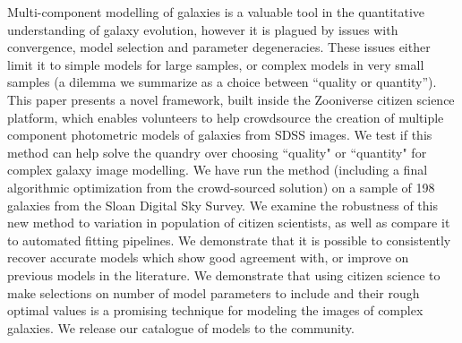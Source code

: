 \documentclass[../main.tex]{subfiles}
\begin{document}
Multi-component modelling of galaxies is a valuable tool in the quantitative understanding of galaxy evolution, however it is plagued by issues with convergence, model selection and parameter degeneracies. These issues either limit it to simple models for large samples, or complex models in very small samples  (a dilemma we summarize as a choice between “quality or quantity”). This paper presents a novel framework, built inside the Zooniverse citizen science platform, which enables volunteers to help crowdsource the creation of multiple component photometric models of galaxies from SDSS images. We test if this method can help solve the quandry over choosing ``quality" or ``quantity" for complex galaxy image modelling.
We have run the method (including a final algorithmic optimization from the crowd-sourced solution) on a sample of 198 galaxies from the Sloan Digital Sky Survey. We examine the robustness of this new method to variation in population of citizen scientists, as well as compare it to automated fitting pipelines. We demonstrate that it is possible to consistently recover accurate models which show good agreement with, or improve on previous models in the literature. We demonstrate that using citizen science to make selections on number of model parameters to include and their rough optimal values is a promising technique for modeling the images of complex galaxies. We release our catalogue of models to the community.
\end{document}

